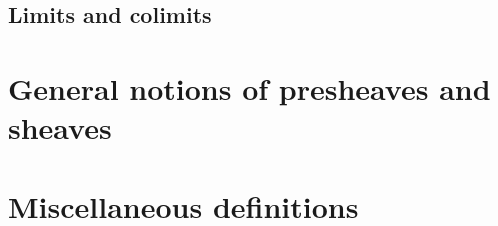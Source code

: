 \subsection{Limits and colimits}








\section{General notions of presheaves and sheaves}










\section{Miscellaneous definitions}
















